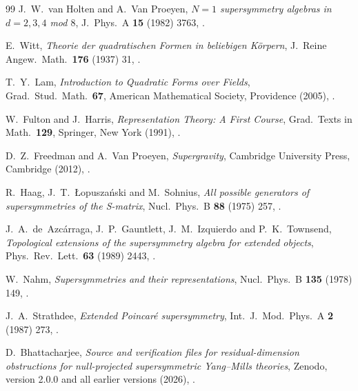 \begin{thebibliography}{99}
J.~W.~van Holten and A.~Van Proeyen, \textit{$N=1$ supersymmetry algebras in $d=2,3,4$ mod $8$}, J.\ Phys.\ A \textbf{15} (1982) 3763, .

E.~Witt, \textit{Theorie der quadratischen Formen in beliebigen K\"orpern}, J.\ Reine Angew.\ Math.\ \textbf{176} (1937) 31, .

T.~Y.~Lam, \textit{Introduction to Quadratic Forms over Fields}, Grad.\ Stud.\ Math.\ \textbf{67}, American Mathematical Society, Providence (2005), .

W.~Fulton and J.~Harris, \textit{Representation Theory: A First Course}, Grad.\ Texts in Math.\ \textbf{129}, Springer, New York (1991), .

D.~Z.~Freedman and A.~Van Proeyen, \textit{Supergravity}, Cambridge University Press, Cambridge (2012), .

R.~Haag, J.~T.~{\L}opusza\'nski and M.~Sohnius, \textit{All possible generators of supersymmetries of the S-matrix}, Nucl.\ Phys.\ B \textbf{88} (1975) 257, .

J.~A.~de~Azc\'arraga, J.~P.~Gauntlett, J.~M.~Izquierdo and P.~K.~Townsend, \textit{Topological extensions of the supersymmetry algebra for extended objects}, Phys.\ Rev.\ Lett.\ \textbf{63} (1989) 2443, .

W.~Nahm, \textit{Supersymmetries and their representations}, Nucl.\ Phys.\ B \textbf{135} (1978) 149, .

J.~A.~Strathdee, \textit{Extended Poincar\'e supersymmetry}, Int.\ J.\ Mod.\ Phys.\ A \textbf{2} (1987) 273, .

D.~Bhattacharjee, \emph{Source and verification files for residual-dimension
obstructions for null-projected supersymmetric Yang--Mills theories},
Zenodo, version 2.0.0 and all earlier versions (2026), .


\end{thebibliography}
